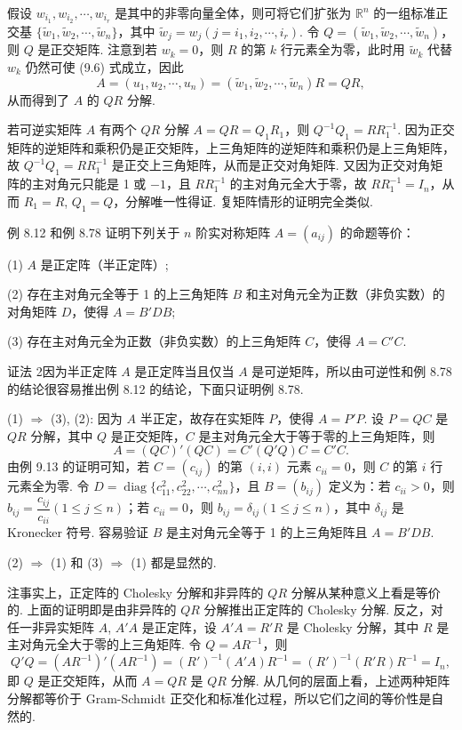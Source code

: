 \documentclass[UTF8, 12pt, fontset=fandol, oneside]{ctexart}
\begin{document}
假设 $w_{i_1},w_{i_2},\cdots,w_{i_r}$ 是其中的非零向量全体，则可将它们扩张为 $\mathbb{R}^n$ 的一组标准正交基 $\{\widetilde{w}_1,\widetilde{w}_2,\cdots,\widetilde{w}_n\}$，其中 $\widetilde{w}_j=w_j(j=i_1,i_2,\cdots,i_r)$. 令 $Q=(\widetilde{w}_1,\widetilde{w}_2,\cdots,\widetilde{w}_n)$，则 $Q$ 是正交矩阵. 注意到若 $w_k=0$，则 $R$ 的第 $k$ 行元素全为零，此时用 $\widetilde{w}_k$ 代替 $w_k$ 仍然可使 (9.6) 式成立，因此
\[
A=(u_1,u_2,\cdots,u_n)=(\widetilde{w}_1,\widetilde{w}_2,\cdots,\widetilde{w}_n)R=QR,
\]
从而得到了 $A$ 的 $QR$ 分解.

若可逆实矩阵 $A$ 有两个 $QR$ 分解 $A=QR=Q_1R_1$，则 $Q^{-1}Q_1=RR_1^{-1}$. 因为正交矩阵的逆矩阵和乘积仍是正交矩阵，上三角矩阵的逆矩阵和乘积仍是上三角矩阵，故 $Q^{-1}Q_1=RR_1^{-1}$ 是正交上三角矩阵，从而是正交对角矩阵. 又因为正交对角矩阵的主对角元只能是 1 或 $-1$，且 $RR_1^{-1}$ 的主对角元全大于零，故 $RR_1^{-1}=I_n$，从而 $R_1=R$, $Q_1=Q$，分解唯一性得证. 复矩阵情形的证明完全类似.

例 8.12 和例 8.78 证明下列关于 $n$ 阶实对称矩阵 $A=(a_{ij})$ 的命题等价：

(1) $A$ 是正定阵（半正定阵）;

(2) 存在主对角元全等于 1 的上三角矩阵 $B$ 和主对角元全为正数（非负实数）的对角矩阵 $D$，使得 $A=B'DB$;

(3) 存在主对角元全为正数（非负实数）的上三角矩阵 $C$，使得 $A=C'C$.

证法 2\quad 因为半正定阵 $A$ 是正定阵当且仅当 $A$ 是可逆矩阵，所以由可逆性和例 8.78 的结论很容易推出例 8.12 的结论，下面只证明例 8.78.

(1) $\Rightarrow$ (3), (2): 因为 $A$ 半正定，故存在实矩阵 $P$，使得 $A=P'P$. 设 $P=QC$ 是 $QR$ 分解，其中 $Q$ 是正交矩阵，$C$ 是主对角元全大于等于零的上三角矩阵，则
\[
A=(QC)'(QC)=C'(Q'Q)C=C'C.
\]
由例 9.13 的证明可知，若 $C=(c_{ij})$ 的第 $(i,i)$ 元素 $c_{ii}=0$，则 $C$ 的第 $i$ 行元素全为零. 令 $D=\operatorname{diag}\{c_{11}^2,c_{22}^2,\cdots,c_{nn}^2\}$，且 $B=(b_{ij})$ 定义为：若 $c_{ii}>0$，则 $b_{ij}=\dfrac{c_{ij}}{c_{ii}}(1\le j\le n)$；若 $c_{ii}=0$，则 $b_{ij}=\delta_{ij}(1\le j\le n)$，其中 $\delta_{ij}$ 是 Kronecker 符号. 容易验证 $B$ 是主对角元全等于 1 的上三角矩阵且 $A=B'DB$.

(2) $\Rightarrow$ (1) 和 (3) $\Rightarrow$ (1) 都是显然的.

注\quad 事实上，正定阵的 Cholesky 分解和非异阵的 $QR$ 分解从某种意义上看是等价的. 上面的证明即是由非异阵的 $QR$ 分解推出正定阵的 Cholesky 分解. 反之，对任一非异实矩阵 $A$, $A'A$ 是正定阵，设 $A'A=R'R$ 是 Cholesky 分解，其中 $R$ 是主对角元全大于零的上三角矩阵. 令 $Q=AR^{-1}$，则
\[
Q'Q=(AR^{-1})'(AR^{-1})=(R')^{-1}(A'A)R^{-1}=(R')^{-1}(R'R)R^{-1}=I_n,
\]
即 $Q$ 是正交矩阵，从而 $A=QR$ 是 $QR$ 分解. 从几何的层面上看，上述两种矩阵分解都等价于 Gram-Schmidt 正交化和标准化过程，所以它们之间的等价性是自然的.
\end{document}
